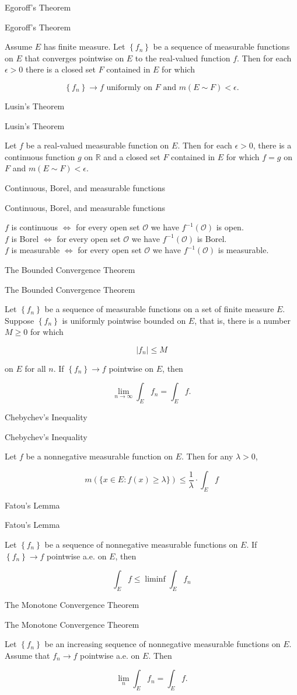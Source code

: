 \documentclass[17pt]{extarticle}
\newcommand{\boxset}[2]{\begin{mdframed}[style=darkQuesion]
#1
\end{mdframed}
\newpage
\begin{mdframed}[style=darkQuesion]
#1
  \end{mdframed}
\begin{mdframed}[style=darkAnswer]
#2
  \end{mdframed}
  \newpage
}
\begin{document}
\boxset{Egoroff's Theorem}
{Assume $E$ has finite measure. Let $\left\{f_{n}\right\}$ be a sequence of measurable functions on $E$ that converges pointwise on $E$ to the real-valued function $f$. Then for each $\epsilon>0$ there is a closed set $F$ contained in $E$ for which

\[
\left\{f_{n}\right\} \rightarrow f \text { uniformly on } F \text { and } m(E \sim F)<\epsilon .
\]

}
\boxset{Lusin's Theorem }
{Let $f$ be a real-valued measurable function on $E$. Then for each $\epsilon>0$, there is a continuous function $g$ on $\mathbb{R}$ and a closed set $F$ contained in $E$ for which $f=g$ on $F$ and $m(E \sim F)<\epsilon$.}
\boxset{Continuous, Borel, and measurable functions}
{
$f$ is continuous $\Longleftrightarrow$ for every open set $\mathcal{O}$ we have $f^{-1}(\mathcal{O})$ is open.\[\ \]
$f$ is Borel $\Longleftrightarrow$ for every open set $\mathcal{O}$ we have $f^{-1}(\mathcal{O})$ is Borel.\[\ \]
$f$ is measurable $\Longleftrightarrow$ for every open set $\mathcal{O}$ we have $f^{-1}(\mathcal{O})$ is measurable.\[\ \]
}
\boxset{The Bounded Convergence Theorem}
{Let $\left\{f_{n}\right\}$ be a sequence of measurable functions on a set of finite measure $E$. Suppose $\left\{f_{n}\right\}$ is uniformly pointwise bounded on $E$, that is, there is a number $M \geq 0$ for which

\[
\left|f_{n}\right| \leq M
\]

on $E$ for all $n$. If $\left\{f_{n}\right\} \rightarrow f$ pointwise on $E$, then

\[
\lim _{n \rightarrow \infty} \int_{E} f_{n}=\int_{E} f .
\]

}
\boxset{Chebychev's Inequality}
{Let $f$ be a nonnegative measurable function on $E$. Then for any $\lambda>0$,

\[
m(\{x \in E: f(x) \geq \lambda\}) \leq \frac{1}{\lambda} \cdot \int_{E} f
\]

}
\boxset{Fatou's Lemma}
{Let $\left\{f_{n}\right\}$ be a sequence of nonnegative measurable functions on $E$. If $\left\{f_{n}\right\} \rightarrow f$ pointwise a.e. on $E$, then

\[
\int_{E} f \leq \liminf \int_{E} f_{n}
\]

}
\boxset{The Monotone Convergence Theorem}
{Let $\left\{f_{n}\right\}$ be an increasing sequence of nonnegative measurable functions on $E$. Assume that $f_{n} \rightarrow f$ pointwise a.e. on $E$. Then

\[
\lim _{n} \int_{E} f_{n}=\int_{E} f .
\]

}
\end{document}
